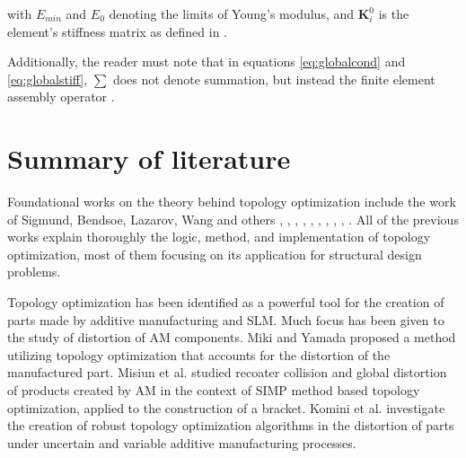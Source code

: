 \documentclass[../main.tex]{subfiles}
\begin{document}
with $E_{min}$ and $E_0$ denoting the limits of Young's modulus, and $\bm{K}_i^0$ is the element's stiffness matrix as defined in \cite{liuEfficient3DTopology2014}.

Additionally, the reader must note that in equations \ref{eq:globalcond} and \ref{eq:globalstiff}, $\sum$ does not denote summation, but instead the finite element assembly operator \cite{hornbergerFiniteElementMethod2005}. 

\section{Summary of literature}

Foundational works on the theory behind topology optimization include the work of Sigmund, Bendsoe, Lazarov, Wang and others \cite{bendsoeGeneratingOptimalTopologies1988}, \cite{bendsoeOptimalShapeDesign1989}, \cite{bendsoeOptimizationStructuralTopology1995}, \cite{bendsoeMaterialInterpolationSchemes1999}, \cite{bendsoeTopologyOptimization2002}, \cite{groenHomogenizationbasedTopologyOptimization2018}, \cite{lazarovFiltersTopologyOptimization2011}, \cite{wangProjectionMethodsConvergence2011a}, \cite{allaireShapeOptimizationHomogenization2002}, \cite{allaireHomogenizationMethodTopology2019}. All of the previous works explain thoroughly the logic, method, and implementation of topology optimization, most of them focusing on its application for structural design problems. 

Topology optimization has been identified as a powerful tool for the creation of parts made by additive manufacturing and SLM. Much focus has been given to the study of distortion of AM components. Miki and Yamada \cite{mikiTopologyOptimizationConsidering2021} proposed a method utilizing topology optimization that accounts for the distortion of the manufactured part. Misiun et al. \cite{misiunTopologyOptimizationAdditive2021} studied recoater collision and global distortion of products created by AM in the context of SIMP method based topology optimization, applied to the construction of a bracket. Komini et al. \cite{kominiRobustTopologyOptimization2023} investigate the creation of robust topology optimization algorithms in the distortion of parts under uncertain and variable additive manufacturing processes.
\end{document}

